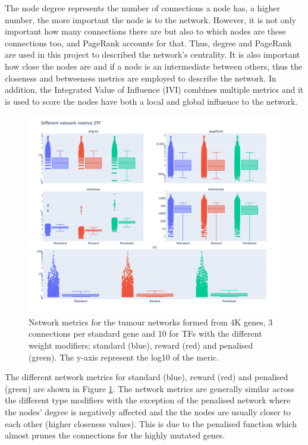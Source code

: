 The node degree represents the number of connections a node has, a higher number, the more important the node is to the network. However, it is not only important how many connections there are but also to which nodes are these connections too, and PageRank\cite{Brin1998-mc} accounts for that. Thus, degree and PageRank are used in this project to described the network's centrality. It is also important how close the nodes are and if a node is an intermediate between others, thus the closeness and betweeness metrics are employed to describe the network. In addition, the Integrated Value of Influence (IVI) \cite{Salavaty2020-wo} combines multiple metrics and it is used to score the nodes have both a local and global influence to the network.

\begin{figure}[!htb]    \centering\includegraphics[width=1.0\textwidth,height=0.7\textheight,keepaspectratio]{Sections/Network_I/Resources/Tum_network/NetworkMetricsComp_10TF.png}
    \caption{Network metrics for the tumour networks formed from 4K genes, 3 connections per standard gene and 10 for TFs with the different weight modifiers; standard (blue), reward (red) and penalised (green). The y-axis represent the log10 of the meric. }
    \label{fig:N_I:net_metrics_tum}
\end{figure}

The different network metrics for standard (blue), reward (red) and penalised (green) are shown in Figure \ref{fig:N_I:net_metrics_tum}. The network metrics are generally similar across the different type modifiers with the exception of the penalised network where the nodes' degree is negatively affected and the the nodes are usually closer to each other (higher closeness values). This is due to the penalised function which almost prunes the connections for the highly mutated genes.


